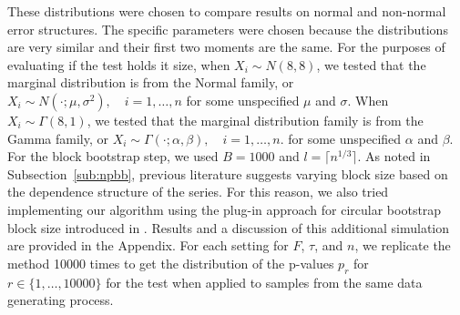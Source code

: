 \documentclass[12pt]{article}
\begin{document}
These distributions
were chosen to compare results on normal and non-normal
error structures. The specific parameters were chosen because the distributions
are very similar and their first two moments are the same. For the purposes of
evaluating if the test holds it size, when $X_i \sim N(8, 8)$, we tested that the
marginal distribution is from the
Normal family, or
$X_i \sim N(\cdot ; \mu, \sigma^2), \quad i = 1, \ldots, n$
for some unspecified $\mu$ and $\sigma$. When $X_i \sim \Gamma(8, 1)$, we tested
that the marginal distribution family is from the Gamma family,
or
$X_i \sim \Gamma(\cdot ; \alpha, \beta), \quad i = 1, \ldots, n$.
for some unspecified $\alpha$ and $\beta$. For the block bootstrap step,
we used $B = 1000$ and $l = \lceil n^{1/3} \rceil$.
As noted in Subsection~\ref{sub:npbb}, previous literature
suggests varying block size based on the dependence structure of the series.
For this reason,
we also tried implementing our algorithm using the plug-in approach for circular
bootstrap block size introduced in \citet{politis2004automatic}. Results and
a discussion of this additional simulation are provided in the Appendix.
For each setting for $F$, $\tau$, and $n$, we replicate the method 10000 times
to get the distribution of the p-values $p_r$ for
$r \in \{1, \dots, 10000\}$
for the test when applied to samples from the same data generating process.
\end{document}
